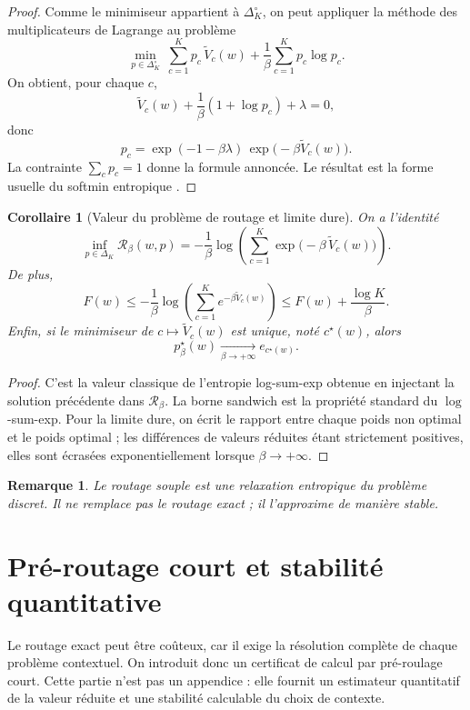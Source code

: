 \documentclass[11pt,a4paper]{article}
\newtheorem{corollary}{Corollaire}[section]
\newtheorem{remark}{Remarque}[section]
\newcommand{\Rcal}{\mathcal R}
\begin{document}
\begin{proof}
Comme le minimiseur appartient à \(\Delta_K^\circ\), on peut appliquer la méthode des multiplicateurs de Lagrange au problème
\[
\min_{p\in\Delta_K^\circ}\ \sum_{c=1}^K p_c\,\widetilde V_c(w)+\frac{1}{\beta}\sum_{c=1}^K p_c\log p_c.
\]
On obtient, pour chaque \(c\),
\[
\widetilde V_c(w)+\frac{1}{\beta}(1+\log p_c)+\lambda=0,
\]
donc
\[
p_c=\exp(-1-\beta\lambda)\,\exp\!\bigl(-\beta\widetilde V_c(w)\bigr).
\]
La contrainte \(\sum_c p_c=1\) donne la formule annoncée. Le résultat est la forme usuelle du softmin entropique \cite{BauschkeCombettes2017,RockafellarWets1998}.
\end{proof}

\begin{corollary}[Valeur du problème de routage et limite dure]
On a l'identité
\[
\inf_{p\in\Delta_K}\Rcal_\beta(w,p)
=
-\frac{1}{\beta}\log\!\left(\sum_{c=1}^K \exp\!\bigl(-\beta\,\widetilde V_c(w)\bigr)\right).
\]
De plus,
\[
F(w)\le -\frac{1}{\beta}\log\!\left(\sum_{c=1}^K e^{-\beta \widetilde V_c(w)}\right)\le F(w)+\frac{\log K}{\beta}.
\]
Enfin, si le minimiseur de \(c\mapsto \widetilde V_c(w)\) est unique, noté \(c^\star(w)\), alors
\[
p^\star_\beta(w)\xrightarrow[\beta\to+\infty]{}e_{c^\star(w)}.
\]
\end{corollary}

\begin{proof}
C'est la valeur classique de l'entropie log-sum-exp obtenue en injectant la solution précédente dans \(\Rcal_\beta\). La borne sandwich est la propriété standard du \(\log\)-sum-exp. Pour la limite dure, on écrit le rapport entre chaque poids non optimal et le poids optimal ; les différences de valeurs réduites étant strictement positives, elles sont écrasées exponentiellement lorsque \(\beta\to+\infty\).
\end{proof}

\begin{remark}
Le routage souple est une relaxation entropique du problème discret. Il ne remplace pas le routage exact ; il l'approxime de manière stable.
\end{remark}

\section{Pré-routage court et stabilité quantitative}

Le routage exact peut être coûteux, car il exige la résolution complète de chaque problème contextuel. On introduit donc un certificat de calcul par pré-roulage court. Cette partie n'est pas un appendice : elle fournit un estimateur quantitatif de la valeur réduite et une stabilité calculable du choix de contexte.
\end{document}
